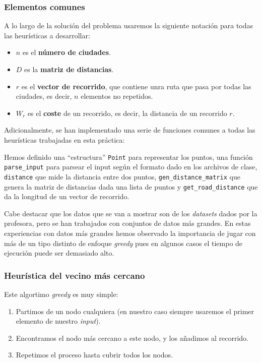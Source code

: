 \documentclass[10pt,a4paper]{article}
\begin{document}
\subsubsection*{Elementos comunes}
A lo largo de la solución del problema usaremos la siguiente notación para todas las heurísticas a desarrollar:
\begin{itemize}
	\item \(n\) es el \textbf{número de ciudades}.
	\item \(D\) es la \textbf{matriz de distancias}.
	\item \(r\) es el \textbf{vector de recorrido}, que contiene unra ruta que pasa por todas las ciudades, es decir, \(n\) elementos no repetidos.
	\item \(W_r\) es el \textbf{coste} de un recorrido, es decir, la distancia de un recorrido \(r\).
\end{itemize}

Adicionalmente, se han implementado una serie de funciones comunes a todas las heurísticas trabajadas en esta práctica:



Hemos definido una ``estructura'' \texttt{Point} para representar los puntos, una función \texttt{parse\_input} para parsear el input según el formato dado en los archivos de clase, \texttt{distance} que mide la distancia entre dos puntos, \texttt{gen\_distance\_matrix} que genera la matriz de distancias dada una lista de puntos y \texttt{get\_road\_distance} que da la longitud de un vector de recorrido.

Cabe destacar que los datos que se van a mostrar son de los \textit{datasets} dados por la profesora, pero se han trabajados con conjuntos de datos más grandes. En estas experiencias con datos más grandes hemos observado la importancia de jugar con más de un tipo distinto de enfoque \textit{greedy} pues en algunos casos el tiempo de ejecución puede ser demasiado alto.

\subsubsection{Heurística del vecino más cercano}

Este algortimo \textit{greedy} es muy simple:
\begin{enumerate}
	\item Partimos de un nodo cualquiera (en nuestro caso siempre usaremos el primer elemento de nuestro \textit{input}).
	\item Encontramos el nodo más cercano a este nodo, y los añadimos al recorrido.
	\item Repetimos el proceso hasta cubrir todos los nodos.
\end{enumerate}
\end{document}
